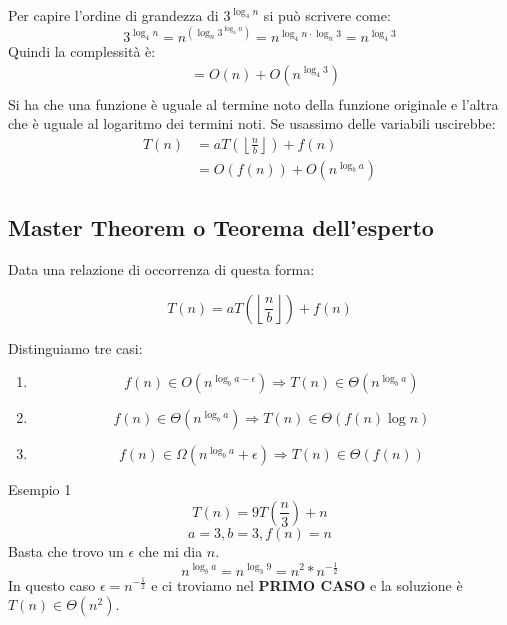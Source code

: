 \documentclass[a4paper]{article}
\begin{document}
\begin{examplebox}{}
  Per capire l'ordine di grandezza di \( 3^{\log_4 n} \) si può scrivere come:
  \[
    3^{\log_4 n} = n^{\left( \log_n 3^{\log_4 n} \right) } = n^{\log_4 n \cdot \log_n 3}
    = n^{\log_4 3}
  \] 
  Quindi la complessità è:
  \[
  \begin{aligned}
    & = O(n) + O(n^{\log_4 3})\\
  \end{aligned}
  \] 
  Si ha che una funzione è uguale al termine noto della funzione originale e l'altra
  che è uguale al logaritmo dei termini noti. Se usassimo delle variabili uscirebbe:
  \[
    \begin{aligned}
      T(n) & = a T \left( \left\lfloor \frac{n}{b} \right\rfloor \right) + f(n)\\
           & = O(f(n)) + O(n^{\log_b a})
    \end{aligned}
  \] 
\end{examplebox}



\subsection{Master Theorem o Teorema dell'esperto}

Data una relazione di occorrenza di questa forma:

\[T(n) = a T \left( \left\lfloor \frac{n}{b} \right\rfloor \right) + f(n)\]

Distinguiamo tre casi:

\begin{enumerate}
    \item \[f(n) \in O(n^{\log_ba - \epsilon}) \Longrightarrow T(n) \in \Theta(n^{\log_ba})\]
    \item \[f(n) \in \Theta(n^{\log_ba}) \Longrightarrow T(n) \in \Theta(f(n)\log n)\]
    \item \[f(n) \in \Omega(n^{\log_ba} + \epsilon) \Longrightarrow T(n) \in \Theta(f(n))\]
\end{enumerate}

\begin{examplebox}{Esempio 1}
    \[T(n) = 9T\left(\frac{n}{3}\right) + n\]
    \[a = 3, b = 3, f(n) = n\]
    Basta che trovo un $\epsilon$ che mi dia $n$.
    \[n^{\log_b a} = n^{\log_3 9} = n^2 * n^{-\frac{1}{2}}\]
    In questo caso $\epsilon = n^{-\frac{1}{2}}$ e ci troviamo nel \textbf{PRIMO CASO} e la soluzione è $T(n) \in \Theta(n^2)$.
\end{examplebox}
\end{document}
